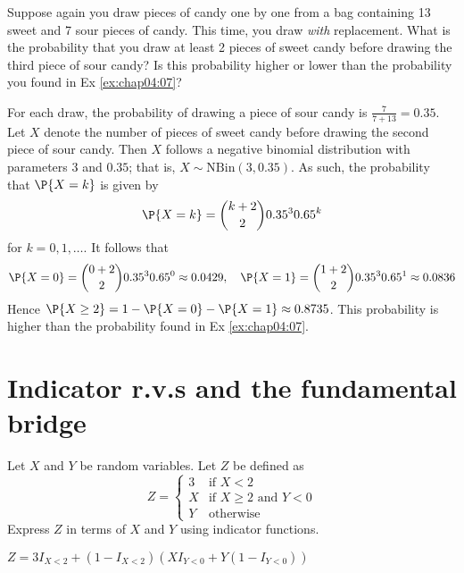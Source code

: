 \begin{exercise}
	Suppose again you draw pieces of candy one by one from a bag containing 13 sweet and 7 sour pieces of candy. This time, you draw \emph{with} replacement. What is the probability that you draw at least 2 pieces of sweet candy before drawing the third piece of sour candy? Is this probability higher or lower than the probability you found in Ex \ref{ex:chap04:07}?
	\begin{solution}
		For each draw, the probability of drawing a piece of sour candy is $\frac{7}{7 + 13} = 0.35$. Let $X$ denote the number of pieces of sweet candy before drawing the second piece of sour candy. Then $X$ follows a negative binomial distribution with parameters $3$ and $0.35$; that is, $X \sim \text{NBin}(3, 0.35)$. As such, the probability that $\P{X = k}$ is given by
		\begin{equation*}
			\P{X = k} = \binom{k + 2}{2} 0.35^3 0.65^k
		\end{equation*}
		for $k = 0, 1, \hdots$. It follows that
		\begin{align*}
			\P{X = 0} = \binom{0 + 2}{2} 0.35^3 0.65^0 \approx 0.0429 , \quad \P{X = 1} = \binom{1 + 2}{2} 0.35^3 0.65^1 \approx 0.0836
		\end{align*}
		Hence $\P{X \geq 2} = 1 - \P{X = 0} - \P{X = 1} \approx 0.8735$. This probability is higher than the probability found in Ex \ref{ex:chap04:07}.
	\end{solution}
\end{exercise}

\section{Indicator r.v.s and the fundamental bridge}
\label{sec:section-4.3}

\begin{exercise}
	Let $X$ and $Y$ be random variables. Let $Z$ be defined as
	\begin{equation}
		Z =
		\begin{cases}
			3 & \text{if } X < 2 \\
			X & \text{if } X \geq 2 \text{ and } Y < 0 \\
			Y & \text{otherwise}
		\end{cases}
	\end{equation}
	Express $Z$ in terms of $X$ and $Y$ using indicator functions.
	\begin{solution}
		$Z = 3 I_{X < 2} + (1 - I_{X < 2})(X I_{Y < 0} + Y (1 - I_{Y < 0}))$
	\end{solution}
\end{exercise}

